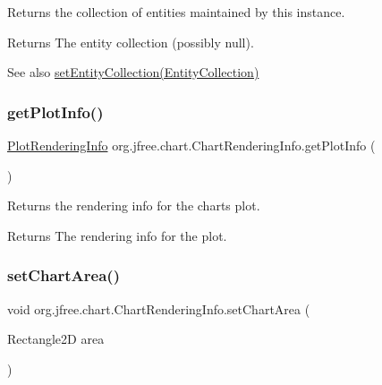 Returns the collection of entities maintained by this instance.

\begin{DoxyReturn}{Returns}
The entity collection (possibly {\ttfamily null}).
\end{DoxyReturn}
\begin{DoxySeeAlso}{See also}
\mbox{\hyperlink{classorg_1_1jfree_1_1chart_1_1_chart_rendering_info_ace7a3e8216473d9d758e99924043d545}{set\+Entity\+Collection(\+Entity\+Collection)}} 
\end{DoxySeeAlso}
\mbox{\label{classorg_1_1jfree_1_1chart_1_1_chart_rendering_info_afe705ff9a7514ce7d8b424c6affc21f4}} 
\subsubsection{\texorpdfstring{get\+Plot\+Info()}{getPlotInfo()}}
{\footnotesize\ttfamily \mbox{\hyperlink{classorg_1_1jfree_1_1chart_1_1plot_1_1_plot_rendering_info}{Plot\+Rendering\+Info}} org.\+jfree.\+chart.\+Chart\+Rendering\+Info.\+get\+Plot\+Info (\begin{DoxyParamCaption}{ }\end{DoxyParamCaption})}

Returns the rendering info for the chart\textquotesingle{}s plot.

\begin{DoxyReturn}{Returns}
The rendering info for the plot. 
\end{DoxyReturn}
\mbox{\label{classorg_1_1jfree_1_1chart_1_1_chart_rendering_info_abb45f3508efa2ad07500a048dd3eabe4}} 
\subsubsection{\texorpdfstring{set\+Chart\+Area()}{setChartArea()}}
{\footnotesize\ttfamily void org.\+jfree.\+chart.\+Chart\+Rendering\+Info.\+set\+Chart\+Area (\begin{DoxyParamCaption}\item[{Rectangle2D}]{area }\end{DoxyParamCaption})}

